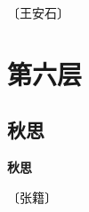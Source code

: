 \documentclass[12pt,UTF-8,openany,fontset=none]{ctexbook}
\begin{document}
\begin{center}
    \vspace{10pt}
    
    \begin{large}
        
        〔王安石〕
        
    \end{large}
    
    \vspace{8pt}
    
    \begin{huge}
        
        \phantom{。}

        \phantom{。}
        
        \phantom{。}

        \phantom{。}
        
    \end{huge}
    
\end{center}

\vspace{8pt}
\clearpage

\chapter{第六层}
\clearpage

\section{秋思}



\begin{center}
    {\bfseries 秋思}
\end{center}

\begin{center}
    \vspace{10pt}
    
    \begin{large}
        
        〔张籍〕
        
    \end{large}
    
    \vspace{8pt}
    
    \begin{huge}
        
        \phantom{。}~~

        \phantom{。}
        
        \phantom{。}~~

        \phantom{。}
        
    \end{huge}
    
\end{center}
\end{document}
